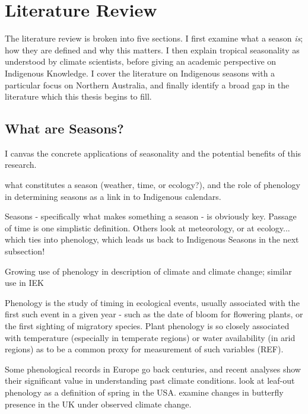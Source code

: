 \chapter{Literature Review}
\label{ch:lit-review}

The literature review is broken into five sections.  I first examine
what a season \emph{is}; how they are defined and why this matters.
I then explain tropical seasonality as understood by climate scientists,
before giving an academic perspective on Indigenous Knowledge.
I cover the literature on Indigenous seasons with a particular
focus on Northern Australia, and finally identify a broad gap in the
literature which this thesis begins to fill.



\section{What are Seasons?}
\label{sec:lit-what-are-seasons}

I canvas the concrete applications of
seasonality and the potential benefits of this research.

what constitutes a season (weather, time, or ecology?),
and the role of phenology in determining seasons as a link in to Indigenous
calendars.

Seasons - specifically what makes something a season - is obviously key.
Passage of time is one simplistic definition.  Others look at meteorology, or
at ecology... which ties into phenology, which leads us back to Indigenous
Seasons in the next subsection!


Growing use of phenology in description of climate and climate change; similar
use in IEK

Phenology is the study of timing in ecological events, usually associated with
the first such event in a given year - such as the date of bloom for flowering
plants, or the first sighting of migratory species.  Plant phenology is so
closely associated with temperature (especially in temperate regions) or water
availability (in arid regions) as to be a common proxy for measurement of such
variables (REF).

Some phenological records in Europe go back centuries, and recent analyses show
their significant value in understanding past climate conditions.
\citet{allstadt2015} look at leaf-out phenology as a definition of spring
in the USA.  \citet{menzel2006} examine changes in butterfly presence in the
UK under observed climate change.




